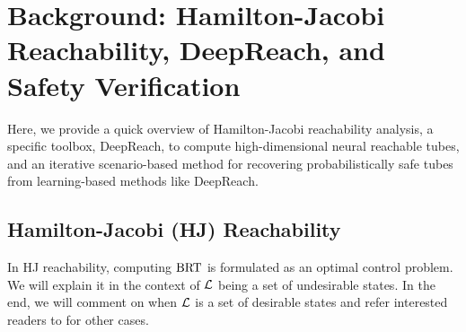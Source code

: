 \section{Background: Hamilton-Jacobi Reachability, DeepReach, and Safety Verification} \label{sec:hj_reachability}
\vspace{-0.5em}
Here, we provide a quick overview of Hamilton-Jacobi reachability analysis, a specific toolbox, DeepReach, to compute high-dimensional neural reachable tubes, and an iterative scenario-based method for recovering probabilistically safe tubes from learning-based methods like DeepReach.

\vspace{-0.5em}
\subsection{Hamilton-Jacobi (HJ) Reachability} \label{sec:background_reachability}
\vspace{-0.5em}
In HJ reachability, computing $\text{BRT}$ is formulated as an optimal control problem. We will explain it in the context of $\mathcal{L}$ being a set of undesirable states. In the end, we will comment on when $\mathcal{L}$ is a set of desirable states and refer interested readers to \citet{bansal2017hamilton} for other cases.

